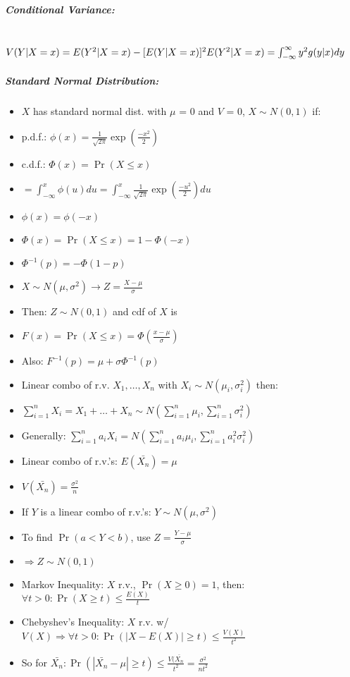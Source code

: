 \documentclass[landscape,10pt]{article}
\begin{document}
\begin{multicols}{4}
\subparagraph*{Conditional Variance: } \ \ \\
    \(V(Y|X=x) = E(Y^2|X=x) - [E(Y|X=x)]^2\\
    E(Y^2|X=x) = \int_{-\infty}^{\infty}{y^2 g(y|x) dy}\)

\subparagraph*{Standard Normal Distribution:}
\begin{itemize}
    \item[] \(X\) has standard normal dist. with \(\mu\) = 0 and \(V\) = 0, \(X \sim N(0,1)\) if:
    \item[] p.d.f.: \( \phi(x) = \frac{1}{\sqrt{2 \pi}}\exp\left (\frac{-x^2}{2}\right)\)
    \item[] c.d.f.: \( 
        \Phi(x) = \Pr(X \leq x) \)
    \item[] \(= \int_{-\infty}^{x}{\phi(u)du}= \int_{-\infty}^{x}{\frac{1}{\sqrt{2 \pi}} \exp\left(\frac{-u^2}{2}\right)du}\)
    \item[] \(\phi(x) = \phi(-x)\)
    \item[] \(\Phi(x) = \Pr(X \leq x) = 1 - \Phi(-x)\)
    \item[] \(\Phi^{-1}(p) = -\Phi(1-p)\)
    \item[] \(X \sim N(\mu, \sigma^2) \rightarrow Z = \frac{X-\mu}{\sigma}\)
    \item[] Then: \(Z \sim N(0,1)\) and cdf of \(X\) is
    \item[] \(F(x) = \Pr(X \leq x) = \Phi(\frac{x-\mu}{\sigma})\)
    \item[] Also: \(F^{-1}(p) = \mu + \sigma \Phi^{-1}(p)\)
    \item[] Linear combo of r.v. \(X_1, \ldots, X_n\) with \(X_i \sim N(\mu_i, \sigma_i^2)\) then:
    \item[] \(\sum\limits_{i = 1}^{n}{X_i} = X_1 + \ldots + X_n \sim N(\sum\limits_{i = 1}^{n} \mu_i, \sum\limits_{i = 1}^{n} \sigma_i^2)\)
    \item[] Generally: \(\sum\limits_{i = 1}^{n}{a_i X_i} = N(\sum\limits_{i = 1}^{n}{a_i \mu_i}, \sum\limits_{i = 1}^{n}{a_i^2 \sigma_i^2})\)
    \item[] Linear combo of r.v.'s: \(E(\bar{X_n}) =  \mu\)
    \item[] \(V(\bar{X_n}) = \frac{\sigma^2}{n}\)
    \item[] If \(Y\) is a linear combo of r.v.'s: \(Y \sim N(\mu, \sigma^2)\)
    \item[] To find \(\Pr(a < Y < b)\), use \(Z = \frac{Y-\mu}{\sigma}\)
    \item[] \(\Rightarrow Z \sim N(0,1)\)
    \item[] Markov Inequality: \(X\) r.v., \(\Pr(X \geq 0) = 1\), then: \(\forall t > 0: \Pr(X \geq t) \leq \frac{E(X)}{t}\)
    \item[] Chebyshev's Inequality: \(X\) r.v. w/ \(V(X) \Rightarrow \forall t > 0: \Pr(|X - E(X)| \geq t) \leq \frac{V(X)}{t^2}\)
    \item[] So for \(\bar{X_n}: \Pr(|\bar{X_n} - \mu|\geq t) \leq \frac{V(\bar{X_n}}{t^2} = \frac{\sigma^2}{nt^2}\)
\end{itemize}


\end{multicols}
\end{document}
